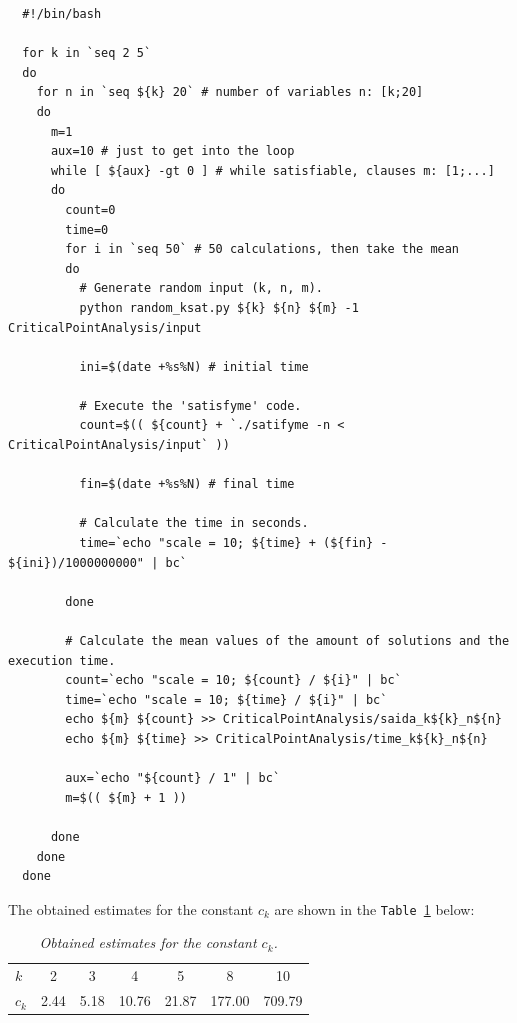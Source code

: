 \documentclass[12pt]{article}
\begin{document}
{\footnotesize
\begin{verbatim}
  #!/bin/bash

  for k in `seq 2 5`
  do
    for n in `seq ${k} 20` # number of variables n: [k;20]
    do
      m=1
      aux=10 # just to get into the loop
      while [ ${aux} -gt 0 ] # while satisfiable, clauses m: [1;...]
      do
        count=0
        time=0
        for i in `seq 50` # 50 calculations, then take the mean
        do
          # Generate random input (k, n, m).
          python random_ksat.py ${k} ${n} ${m} -1 CriticalPointAnalysis/input

          ini=$(date +%s%N) # initial time

          # Execute the 'satisfyme' code.
          count=$(( ${count} + `./satifyme -n < CriticalPointAnalysis/input` ))

          fin=$(date +%s%N) # final time

          # Calculate the time in seconds.
          time=`echo "scale = 10; ${time} + (${fin} - ${ini})/1000000000" | bc`

        done

        # Calculate the mean values of the amount of solutions and the execution time.
        count=`echo "scale = 10; ${count} / ${i}" | bc`
        time=`echo "scale = 10; ${time} / ${i}" | bc`
        echo ${m} ${count} >> CriticalPointAnalysis/saida_k${k}_n${n}
        echo ${m} ${time} >> CriticalPointAnalysis/time_k${k}_n${n}

        aux=`echo "${count} / 1" | bc`
        m=$(( ${m} + 1 ))

      done
    done
  done
\end{verbatim}
}

\linespread{1.5}

The obtained estimates for the constant $c_k$ are shown in the \texttt{Table \ref{tab:result}} below:
\\[-5pt]

\begin{table}[h]
  \begin{center}
    \begin{tabular}{l c c c c c c}
      \hline
      $k$ & 2 & 3 & 4 & 5 & 8 & 10 \\
      $c_k$ & 2.44 & 5.18 & 10.76 & 21.87 & 177.00 & 709.79 \\
      \hline
    \end{tabular}
    \caption{\small{\emph{Obtained estimates for the constant $c_k$.}}}
    \label{tab:result}
  \end{center}
\end{table}
\end{document}
